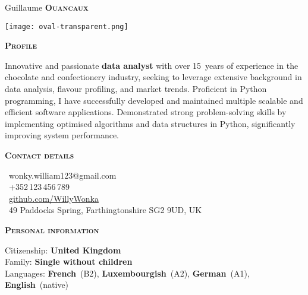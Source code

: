 \documentclass[11pt, a4paper]{article}
\newcommand{\headleft}[1]{\vspace*{3ex}\textsc{\textbf{#1}}\par%
    \vspace*{-1.5ex}\hrulefill\par\vspace*{0.7ex}}
\begin{document}
\setlength{\topskip}{0pt}
\setlength{\parindent}{0pt}
\setlength{\parskip}{0pt}
\setlength{\fboxsep}{0pt}
\pagestyle{empty}
\raggedbottom

\begin{minipage}[t]{0.33\textwidth} %
\colorbox{cvblue}{\begin{minipage}[t][5mm][t]{\textwidth}\null\hfill\null\end{minipage}}

\vspace{-.2ex} %
\colorbox{cvblue!90}{\color{white}  %
\textwidth\relax%
\begin{minipage}[t][293mm][t]{0.82\textwidth}
\raggedright
\vspace*{2.5ex}

\Large Guillaume \textbf{\textsc{Ouancaux}} \normalsize 

\null\hfill\texttt{[image: oval-transparent.png]}\hfill\null

\vspace*{0.5ex} %

\headleft{Profile}
Innovative and passionate \textbf{data analyst} with over 15~years of experience in the chocolate and confectionery industry, seeking to leverage extensive background in data analysis, flavour profiling, and market trends.
Proficient in Python programming, I have successfully developed and maintained multiple scalable and efficient software applications.
Demonstrated strong problem-solving skills by implementing optimised algorithms and data structures in Python, significantly improving system performance.

\headleft{Contact details}
\small %
\MVAt\ {\small wonky.william123@gmail.com} \\[0.4ex]
\Mobilefone\ +352\,123\,456\,789 \\[0.5ex]
\Mundus\ \href{https://github.com/WillyWonka}{github.com/WillyWonka} \\[0.1ex]
\Letter\ 49 Paddocks Spring, Farthingtonshire SG2 9UD, UK
\normalsize

\headleft{Personal information}
Citizenship: \textbf{United Kingdom} \\[0.5ex]
Family: \textbf{Single without children} \\[0.5ex]
Languages: \textbf{French}~(B2), \textbf{Luxembourgish}~(A2), \textbf{German}~(A1), \textbf{English}~(native)


\end{minipage}}
\end{minipage}
\end{document}

